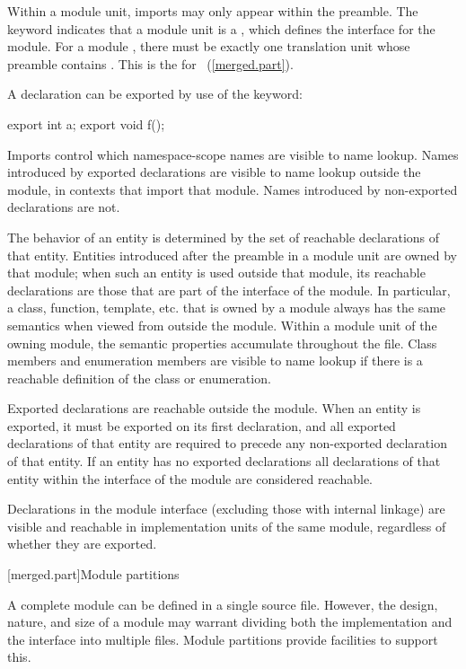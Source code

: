 Within a module unit, imports may only appear within the preamble.
The  keyword indicates that a module unit is a
, which defines the interface for the module.
For a module , there must be exactly one
translation unit whose preamble contains .
This is the 
for ~(\ref{merged.part}).

\pnum
A declaration can be exported by use of the  keyword:
\begin{codeblock}
export int a;
export {
void f();
}
\end{codeblock}
Imports control which namespace-scope names are visible to name lookup.
Names introduced by exported declarations
are visible to name lookup outside the module,
in contexts that import that module.
Names introduced by non-exported declarations are not.

\pnum
The behavior of an entity is determined by
the set of reachable declarations of that entity.
Entities introduced after the preamble in a module unit
are owned by that module;
when such an entity is used outside that module,
its reachable declarations are those
that are part of the interface of the module.
In particular, a class, function, template, etc.
that is owned by a module
always has the same semantics
when viewed from outside the module.
Within a module unit of the owning module,
the semantic properties accumulate throughout the file.
Class members and enumeration members are visible to name lookup
if there is a reachable definition of the class or enumeration.

\pnum
Exported declarations are reachable outside the module.
When an entity is exported,
it must be exported on its first declaration,
and all exported declarations of that entity
are required to precede any non-exported declaration
of that entity.
If an entity has no exported declarations
all declarations of that entity
within the interface of the module
are considered reachable.
 
\pnum
Declarations in the module interface (excluding those with internal linkage)
are visible and reachable in implementation units of the same module,
regardless of whether they are exported.

[merged.part]{Module partitions}

\pnum
A complete module can be defined in a single source file.
However, the design, nature, and size of a module may warrant
dividing both the implementation and the interface
into multiple files.
Module partitions provide facilities to support this.

